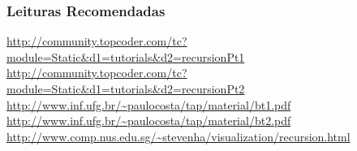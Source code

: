 \begin{frame}
\frametitle{Leituras Recomendadas}

\begin{block}{}
\begin{itemize}
\scriptsize
	\bitem \url{http://community.topcoder.com/tc?module=Static&d1=tutorials&d2=recursionPt1}
	\bitem \url{http://community.topcoder.com/tc?module=Static&d1=tutorials&d2=recursionPt2}
	\bitem \url{http://www.inf.ufg.br/~paulocosta/tap/material/bt1.pdf}
	\bitem \url{http://www.inf.ufg.br/~paulocosta/tap/material/bt2.pdf}
	\bitem \url{http://www.comp.nus.edu.sg/~stevenha/visualization/recursion.html}
\end{itemize}
\end{block}

\end{frame}
